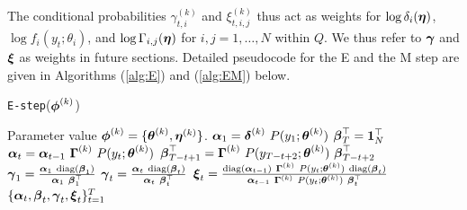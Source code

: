 %
The conditional probabilities $\gamma_{t,i}^{(k)}$ and $\xi_{t,i,j}^{(k)}$ thus act as weights for $\log \delta_{i}(\boldsymbol{\eta})$, $\log f_{i}(y_t;\theta_{i})$, and $\log \Gamma_{i,j}(\boldsymbol{\eta})$ for $i,j = 1,\ldots,N$ within $Q$. We thus refer to $\boldsymbol{\gamma}$ and $\boldsymbol{\xi}$ as weights in future sections. Detailed pseudocode for the E and the M step are given in Algorithms (\ref{alg:E}) and (\ref{alg:EM}) below.
%
\begin{algorithm}
\caption{\texttt{E-step}($\boldsymbol{\phi}^{(k)}$)}\label{alg:E}
\begin{algorithmic}[1]
\Require Parameter value $\boldsymbol{\phi}^{(k)} = \{\boldsymbol{\theta}^{(k)},\boldsymbol{\eta}^{(k)}\}$.
%
\State $\boldsymbol{\alpha}_1 = \boldsymbol{\delta}^{(k)} ~ P(y_1;\boldsymbol{\theta}^{(k)})$
\State $\boldsymbol{\beta}^\top_T = \mathbf{1}_N^\top$
    \State $\boldsymbol{\alpha}_t = \boldsymbol{\alpha}_{t-1} ~ \boldsymbol{\Gamma}^{(k)} ~ P(y_t;\boldsymbol{\theta}^{(k)})$
    \State $\boldsymbol{\beta}^\top_{T-t+1} = \boldsymbol{\Gamma}^{(k)} ~ P(y_{T-t+2};\boldsymbol{\theta}^{(k)}) ~ \boldsymbol{\beta}^\top_{T-t+2}$
\EndFor
%
\State $\boldsymbol{\gamma}_1 = \frac{\boldsymbol{\alpha}_1 ~ \text{diag}(\boldsymbol{\beta}_1)}{\boldsymbol{\alpha}_1 ~ \boldsymbol{\beta}_1^\top}$
%
    \State $\boldsymbol{\gamma}_t = \frac{\boldsymbol{\alpha}_t ~ \text{diag}(\boldsymbol{\beta}_t)}{\boldsymbol{\alpha}_t ~ \boldsymbol{\beta}_t^\top}$
    \State $\boldsymbol{\xi}_t = \frac{\text{diag}(\boldsymbol{\alpha}_{t-1}) ~ \boldsymbol{\Gamma}^{(k)} ~ P(y_t;\boldsymbol{\theta}^{(k)}) ~ \text{diag}(\boldsymbol{\beta}_t)}{\boldsymbol{\alpha}_{t-1} ~ \boldsymbol{\Gamma}^{(k)} ~ P(y_{t};\boldsymbol{\theta}^{(k)}) ~ \boldsymbol{\beta}_{t}^\top}$
\EndFor
%
\State \Return $\{\boldsymbol{\alpha}_t,\boldsymbol{\beta}_t,\boldsymbol{\gamma}_t,\boldsymbol{\xi}_t\}_{t=1}^T$
\end{algorithmic}
\end{algorithm}
